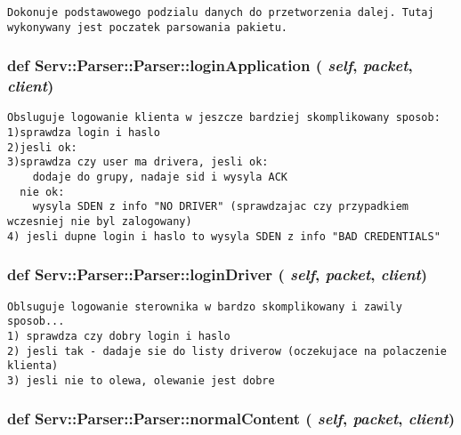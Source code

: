 \footnotesize\begin{verbatim}Dokonuje podstawowego podzialu danych do przetworzenia dalej. Tutaj wykonywany jest poczatek parsowania pakietu.\end{verbatim}
\normalsize
 \hypertarget{class_serv_1_1_parser_1_1_parser_ec3286787a7c8642127416c77e1c2c8f}{
\subsubsection[{loginApplication}]{\setlength{\rightskip}{0pt plus 5cm}def Serv::Parser::Parser::loginApplication ( {\em self}, \/   {\em packet}, \/   {\em client})}}
\label{class_serv_1_1_parser_1_1_parser_ec3286787a7c8642127416c77e1c2c8f}




\footnotesize\begin{verbatim}Obsluguje logowanie klienta w jeszcze bardziej skomplikowany sposob:
1)sprawdza login i haslo
2)jesli ok:
3)sprawdza czy user ma drivera, jesli ok:
    dodaje do grupy, nadaje sid i wysyla ACK
  nie ok:
    wysyla SDEN z info "NO DRIVER" (sprawdzajac czy przypadkiem wczesniej nie byl zalogowany)
4) jesli dupne login i haslo to wysyla SDEN z info "BAD CREDENTIALS"        
\end{verbatim}
\normalsize
 \hypertarget{class_serv_1_1_parser_1_1_parser_e092cef5abd35ec04fa61e71377e1303}{
\subsubsection[{loginDriver}]{\setlength{\rightskip}{0pt plus 5cm}def Serv::Parser::Parser::loginDriver ( {\em self}, \/   {\em packet}, \/   {\em client})}}
\label{class_serv_1_1_parser_1_1_parser_e092cef5abd35ec04fa61e71377e1303}




\footnotesize\begin{verbatim}Oblsuguje logowanie sterownika w bardzo skomplikowany i zawily sposob...
1) sprawdza czy dobry login i haslo
2) jesli tak - dadaje sie do listy driverow (oczekujace na polaczenie klienta)
3) jesli nie to olewa, olewanie jest dobre        
\end{verbatim}
\normalsize
 \hypertarget{class_serv_1_1_parser_1_1_parser_dc1da4d6ff7eb9dbc114f8a426274aa0}{
\subsubsection[{normalContent}]{\setlength{\rightskip}{0pt plus 5cm}def Serv::Parser::Parser::normalContent ( {\em self}, \/   {\em packet}, \/   {\em client})}}
\label{class_serv_1_1_parser_1_1_parser_dc1da4d6ff7eb9dbc114f8a426274aa0}




